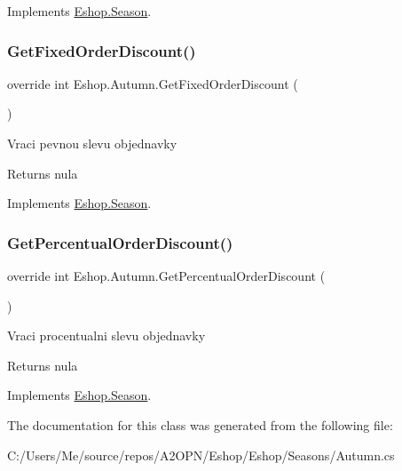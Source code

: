 Implements \mbox{\hyperlink{class_eshop_1_1_season}{Eshop.\+Season}}.

\mbox{\label{class_eshop_1_1_autumn_ac5ee4a4898239df20f6d62a88adf039a}} 
\subsubsection{\texorpdfstring{GetFixedOrderDiscount()}{GetFixedOrderDiscount()}}
{\footnotesize\ttfamily override int Eshop.\+Autumn.\+Get\+Fixed\+Order\+Discount (\begin{DoxyParamCaption}{ }\end{DoxyParamCaption})\hspace{0.3cm}{\ttfamily [virtual]}}



Vraci pevnou slevu objednavky 

\begin{DoxyReturn}{Returns}
nula
\end{DoxyReturn}


Implements \mbox{\hyperlink{class_eshop_1_1_season}{Eshop.\+Season}}.

\mbox{\label{class_eshop_1_1_autumn_afa26bcecad81dc25d57e5fed3379810c}} 
\subsubsection{\texorpdfstring{GetPercentualOrderDiscount()}{GetPercentualOrderDiscount()}}
{\footnotesize\ttfamily override int Eshop.\+Autumn.\+Get\+Percentual\+Order\+Discount (\begin{DoxyParamCaption}{ }\end{DoxyParamCaption})\hspace{0.3cm}{\ttfamily [virtual]}}



Vraci procentualni slevu objednavky 

\begin{DoxyReturn}{Returns}
nula
\end{DoxyReturn}


Implements \mbox{\hyperlink{class_eshop_1_1_season}{Eshop.\+Season}}.



The documentation for this class was generated from the following file\+:\begin{DoxyCompactItemize}
\item 
C\+:/\+Users/\+Me/source/repos/\+A2\+O\+P\+N/\+Eshop/\+Eshop/\+Seasons/Autumn.\+cs\end{DoxyCompactItemize}
